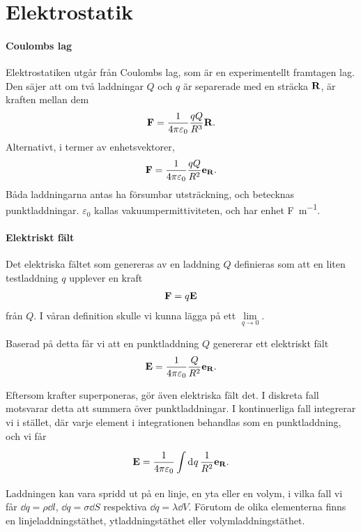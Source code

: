 \section{Elektrostatik}

\paragraph{Coulombs lag}
Elektrostatiken utgår från Coulombs lag, som är en experimentellt framtagen lag. Den säjer att om två laddningar $Q$ och $q$ är separerade med en sträcka $\vb{R}$, är kraften mellan dem
\begin{align*}
	\vb{F} = \frac{1}{4\pi\varepsilon_{0}}\frac{qQ}{R^{3}}\vb{R}.
\end{align*}
Alternativt, i termer av enhetsvektorer,
\begin{align*}
	\vb{F} = \frac{1}{4\pi\varepsilon_{0}}\frac{qQ}{R^{2}}\vb{e}_{\vb{R}}.
\end{align*}
Båda laddningarna antas ha försumbar utsträckning, och betecknas punktladdningar. $\varepsilon_{0}$ kallas vakuumpermittiviteten, och har enhet \si{\farad\per\meter}.

\paragraph{Elektriskt fält}
Det elektriska fältet som genereras av en laddning $Q$ definieras som att en liten testladdning $q$ upplever en kraft
\begin{align*}
	\vb{F} = q\vb{E}
\end{align*}
från $Q$. I våran definition skulle vi kunna lägga på ett $\lim\limits_{q\to 0}$.

Baserad på detta får vi att en punktladdning $Q$ genererar ett elektriskt fält
\begin{align*}
	\vb{E} = \frac{1}{4\pi\varepsilon_{0}}\frac{Q}{R^{2}}\vb{e}_{\vb{R}}.
\end{align*}

Eftersom krafter superponeras, gör även elektriska fält det. I diskreta fall motsvarar detta att summera över punktladdningar. I kontinuerliga fall integrerar vi i stället, där varje element i integrationen behandlas som en punktladdning, och vi får
\begin{align*}
	\vb{E} = \frac{1}{4\pi\varepsilon_{0}}\int\limits_{}^{}\dd[]{q}\frac{1}{R^{2}}\vb{e}_{\vb{R}}.
\end{align*}
Laddningen kan vara spridd ut på en linje, en yta eller en volym, i vilka fall vi får $\dd{q} = \rho\dd{l}$, $\dd{q} = \sigma\dd{S}$ respektiva $\dd{q} = \lambda\dd{V}$. Förutom de olika elementerna finns en linjeladdningstäthet, ytladdningstäthet eller volymladdningstäthet.


